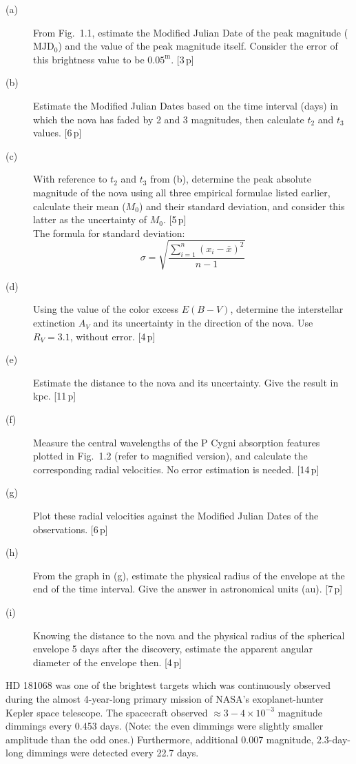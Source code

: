 \begin{description}
\item[(a)] From Fig.~1.1, estimate the Modified Julian Date of the peak
  magnitude ($\mathrm{MJD}_0$) and the value of the peak magnitude itself.
  Consider the error of this brightness value to be $0.05^{\mathrm{m}}$.
  \hfill[3\,p]
\item[(b)] Estimate the Modified Julian Dates based on the time interval
  (days) in which the nova has faded by 2 and 3 magnitudes, then calculate
  $t_2$ and $t_3$ values. \hfill[6\,p]
\item[(c)] With reference to $t_2$ and $t_3$ from (b), determine the peak
  absolute magnitude of the nova using all three empirical formulae listed
  earlier, calculate their mean ($M_0$) and their standard deviation, and
  consider this latter as the uncertainty of $M_0$. \hfill[5\,p] \\
  The formula for standard deviation:
  \[ \sigma = \sqrt{\frac{\sum_{i=1}^{n}(x_i - \bar{x})^2}{n-1}} \]
\item[(d)] Using the value of the color excess $E(B-V)$, determine the
  interstellar extinction $A_V$ and its uncertainty in the direction of the
  nova. Use $R_V = 3.1$, without error. \hfill[4\,p]
\item[(e)] Estimate the distance to the nova and its uncertainty. Give the
  result in kpc. \hfill[11\,p]
\item[(f)] Measure the central wavelengths of the P Cygni absorption
  features plotted in Fig.~1.2 (refer to magnified version), and calculate
  the corresponding radial velocities. No error estimation is needed.
  \hfill[14\,p]
\item[(g)] Plot these radial velocities against the Modified Julian Dates of
  the observations. \hfill[6\,p]
\item[(h)] From the graph in (g), estimate the physical radius of the
  envelope at the end of the time interval. Give the answer in astronomical
  units (au). \hfill[7\,p]
\item[(i)] Knowing the distance to the nova and the physical radius of the
  spherical envelope 5 days after the discovery, estimate the apparent
  angular diameter of the envelope then. \hfill[4\,p]
\end{description}

HD 181068 was one of the brightest targets which was continuously observed
during the almost 4-year-long primary mission of NASA's exoplanet-hunter
Kepler space telescope. The spacecraft observed ${\approx}3-4 \times 10^{-3}$
magnitude dimmings every 0.453 days. (Note: the even dimmings were slightly
smaller amplitude than the odd ones.) Furthermore, additional 0.007
magnitude, 2.3-day-long dimmings were detected every 22.7 days.

